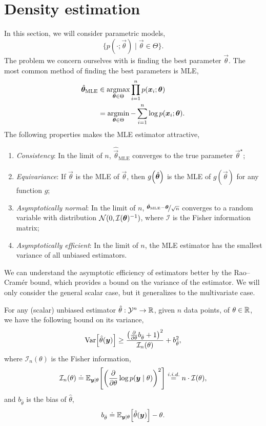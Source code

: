 \section{Density estimation}

In this section, we will consider parametric models, \[
    \{ p(\cdot; \vec{\theta}) \mid \vec{\theta} \in \Theta \}.
\]
The problem we concern ourselves with is finding the best parameter $\vec{\theta}$. The most common
method of finding the best parameters is MLE,
\begin{align*}
    \hat{\vec{\theta}}_{\mathrm{MLE}} & \in \argmax_{\vec{\theta} \in \Theta} \prod_{i=1}^n p(\vec{x}_i; \vec{\theta})      \\
                                      & = \argmin_{\vec{\theta} \in \Theta} - \sum_{i=1}^n \log p(\vec{x}_i; \vec{\theta}).
\end{align*}
The following properties makes the MLE estimator attractive,
\begin{enumerate}
    \item \textit{Consistency}: In the limit of $n$, $\hat{\vec{\theta}}_{\mathrm{MLE}}$ converges to the true
          parameter $\vec{\theta}^\star$;
    \item \textit{Equivariance}: If $\hat{\vec{\theta}}$ is the MLE of $\vec{\theta}$, then
          $g\lft(\hat{\vec{\theta}}\rgt)$ is the MLE of $g(\vec{\theta})$ for any function $g$;
    \item \textit{Asymptotically normal}: In the limit of $n$, $\nicefrac{\hat{\vec{\theta}}_{\mathrm{MLE}} -
                  \vec{\theta}}{\sqrt{n}}$ converges to a random variable with distribution $\mathcal{N}(0,
              \inv{\mathcal{I}(\vec{\theta})})$, where $\mathcal{I}$ is the Fisher information matrix;
    \item \textit{Asymptotically efficient}: In the limit of $n$, the MLE estimator has the smallest variance of all
          unbiased estimators.
\end{enumerate}

We can understand the asymptotic efficiency of estimators better by the Rao--Cram\'er bound, which
provides a bound on the variance of the estimator. We will only consider the general scalar case,
but it generalizes to the multivariate case.

\begin{theorem}
    For any (scalar) unbiased estimator $\hat{\theta}: \mathcal{Y}^n \to \R$, given $n$ data points,
    of $\theta \in \R$, we have the following bound on its variance, \[
        \Var\lft[\hat{\theta}(\vec{y})\rgt] \geq \frac{\lft( \pdv*{b_{\hat{\theta}}}{\theta} + 1 \rgt)^2}{\mathcal{I}_n(\theta)} + b_{\hat{\theta}}^2,
    \]
    where $\mathcal{I}_n(\theta)$ is the Fisher information, \[
        \mathcal{I}_n(\theta) \doteq \E_{\vec{y} \mid \theta} \lft[ \lft( \pdv*{\log p(\vec{y} \mid \theta)}{\theta} \rgt)^2 \rgt] \overset{\text{\iid}}{=} n \cdot \mathcal{I}(\theta),
    \]
    and $b_{\hat{\theta}}$ is the bias of $\hat{\theta}$, \[
        b_{\hat{\theta}} \doteq \E_{\vec{y} \mid \theta} \lft[ \hat{\theta}(\vec{y}) \rgt] - \theta.
    \]
\end{theorem}

